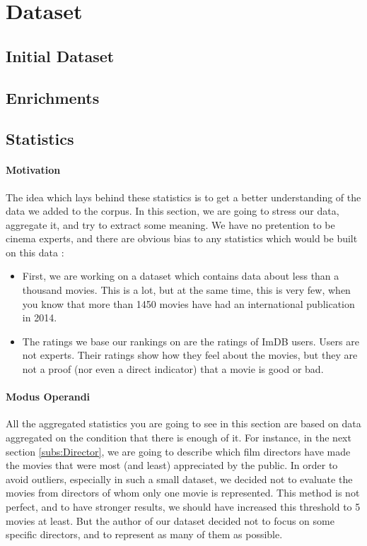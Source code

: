 \section{Dataset}
\subsection{Initial Dataset}
\subsection{Enrichments}

\subsection{Statistics}

\paragraph{Motivation}
\label{par:Motivation}
The idea which lays behind these statistics is to get a better understanding of the data we added to the corpus.
In this section, we are going to stress our data, aggregate it, and try to extract some meaning.
We have no pretention to be cinema experts, and there are obvious bias to any statistics which would be built on this data :
\begin{itemize}
    \item First, we are working on a dataset which contains data about less than a thousand movies.
    This is a lot, but at the same time, this is very few, when you know that more than 1450 movies have had an international publication in 2014.
    \item The ratings we base our rankings on are the ratings of ImDB users. Users are not experts.
    Their ratings show how they feel about the movies, but they are not a proof (nor even a direct indicator) that a movie is good or bad.
\end{itemize}

\paragraph{Modus Operandi}
\label{par:ModusOperandi}
All the aggregated statistics you are going to see in this section are based on data aggregated on the condition that there is enough of it.
For instance, in the next section \ref{subs:Director}, we are going to describe which film directors have made the movies that were most (and least) appreciated by the public.
In order to avoid outliers, especially in such a small dataset, we decided not to evaluate the movies from directors of whom only one movie is represented.
This method is not perfect, and to have stronger results, we should have increased this threshold to 5 movies at least.
But the author of our dataset decided not to focus on some specific directors, and to represent as many of them as possible.

